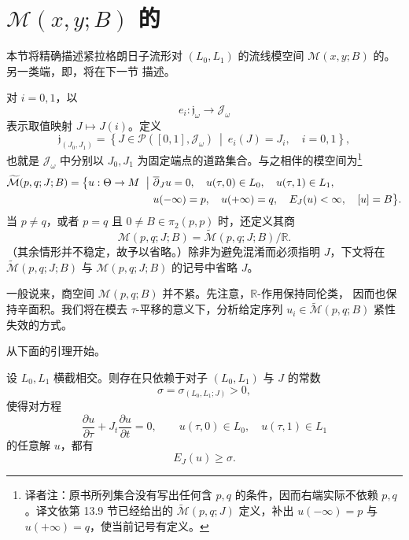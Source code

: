 \section{\texorpdfstring{$\mathcal M(x,y;B)$ 的\termSplittingEnd{}}{M(x,y;B) 的分裂端}}
\label{sec:splitting-ends}

本节将精确描述紧拉格朗日子流形对 $(L_0,L_1)$ 的\personFloer{}流线模空间
$\mathcal M(x,y;B)$ 的\termSplittingEnd{}。另一类端，即\termBubblingEnd{}，将在下一节
描述。

对 $i=0,1$，以
\[
  e_i:\mathfrak j_\omega\longrightarrow\mathcal J_\omega
\]
表示取值映射 $J\mapsto J(i)$。定义
\[
  \mathfrak j_{(J_0,J_1)}
  =
  \left\{
    J\in\mathcal P([0,1],\mathcal J_\omega)
    \ \middle|\
    e_i(J)=J_i,\quad i=0,1
  \right\},
\]
也就是 $\mathcal J_\omega$ 中分别以 $J_0,J_1$ 为固定端点的道路集合。与之相伴的\personFloer{}模空间为\footnote{译者注：原书所列集合没有写出任何含 $p,q$ 的条件，因而右端实际不依赖
$p,q$。译文依第 13.9 节已经给出的 $\widetilde{\mathcal M}(p,q;J)$ 定义，补出
$u(-\infty)=p$ 与 $u(+\infty)=q$，使当前记号有定义。}
\[
  \begin{aligned}
  \widetilde{\mathcal M}(p,q;J;B)
  =\bigl\{
    u:\Theta\to M\ \bigm|\ &\overline\partial_Ju=0,\quad
    u(\tau,0)\in L_0,\quad u(\tau,1)\in L_1,\\
  &u(-\infty)=p,\quad u(+\infty)=q,\quad
    E_J(u)<\infty,\quad [u]=B
  \bigr\}.
  \end{aligned}
\]
当 $p\neq q$，或者 $p=q$ 且 $0\neq B\in\pi_2(p,p)$ 时，还定义其商
\[
  \mathcal M(p,q;J;B)
  =
  \widetilde{\mathcal M}(p,q;J;B)/\mathbb R.
\]
（其余情形并不稳定，故予以省略。）除非为避免混淆而必须指明 $J$，下文将在
$\widetilde{\mathcal M}(p,q;J;B)$ 与 $\mathcal M(p,q;J;B)$ 的记号中省略 $J$。

一般说来，商空间 $\mathcal M(p,q;B)$ 并不紧。先注意，$\mathbb R$-作用保持同伦类，
因而也保持辛面积。我们将在模去 $\tau$-平移的意义下，分析给定序列
$u_i\in\widetilde{\mathcal M}(p,q;B)$ 紧性失效的方式。

从下面的引理开始。

\begin{lemma}
\label{lem:positive-energy-gap}
设 $L_0,L_1$ 横截相交。则存在只依赖于对子 $(L_0,L_1)$ 与 $J$ 的常数
\[
  \sigma=\sigma_{(L_0,L_1;J)}>0,
\]
使得对方程
\[
  \frac{\partial u}{\partial\tau}
  +J_t\frac{\partial u}{\partial t}=0,
  \qquad
  u(\tau,0)\in L_0,
  \quad
  u(\tau,1)\in L_1
\]
的任意\termNonStationary{}解 $u$，都有
\begin{equation}
  E_J(u)\geq\sigma.
\label{eq:positive-energy-gap}
\end{equation}
\end{lemma}

